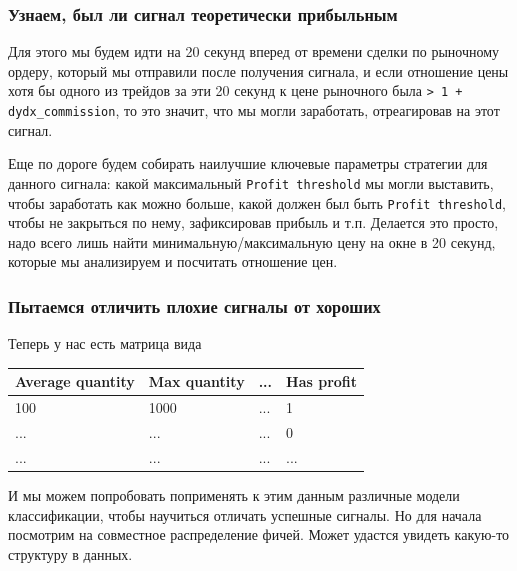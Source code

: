 \subsubsection{Узнаем, был ли сигнал теоретически прибыльным}
Для этого мы будем идти на 20 секунд вперед от времени сделки по рыночному ордеру, который мы отправили после получения сигнала, и если отношение цены хотя бы одного из трейдов за эти 20 секунд к цене рыночного была \texttt{> 1 + dydx\_commission}, то это значит, что мы могли заработать, отреагировав на этот сигнал. 

Еще по дороге будем собирать наилучшие ключевые параметры стратегии для данного сигнала: какой максимальный \texttt{Profit threshold} мы могли выставить, чтобы заработать как можно больше, какой должен был быть \texttt{Profit threshold}, чтобы не закрыться по нему, зафиксировав прибыль и т.п. Делается это просто, надо всего лишь найти минимальную/максимальную цену на окне в 20 секунд, которые мы анализируем и посчитать отношение цен.

\subsubsection{Пытаемся отличить плохие сигналы от хороших}
        Теперь у нас есть матрица вида

\begin{table}[h]
    \centering
    \begin{tabular}[t]{ | l | l | l | l | }
    \hline
    Average quantity & Max quantity & ... & Has profit \\ \hline
    100 & 1000 & ... & 1 \\
    ... & ... & ... & 0 \\
    ... & ... & ... & ... \\
    \hline
    \end{tabular}
    \label{table:satellites}
\end{table}

И мы можем попробовать поприменять к этим данным различные модели классификации, чтобы научиться отличать успешные сигналы. Но для начала посмотрим на совместное распределение фичей. Может удастся увидеть какую-то структуру в данных. 

